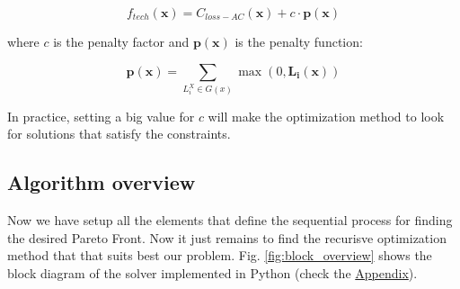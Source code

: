 \documentclass[a4paper,11pt, titlepage, twoside]{article}
\begin{document}
\begin{equation}
    f_{tech}(\mathbf{x}) = C_{loss-AC}(\mathbf{x}) + c \cdot \mathbf{p(x)}
\end{equation}

where $c$ is the penalty factor and $\mathbf{p(x)}$ is the penalty function:

\begin{equation}
    \mathbf{p(x)} = \sum_{L_i^X \in G(x)} \max(0, \mathbf{L_i(x)})
\end{equation}

In practice, setting a big value for $c$ will make the optimization method to look for solutions that satisfy the constraints.
\newpage
\subsection{Algorithm overview}

Now we have setup all the elements that define the sequential process for finding the desired Pareto Front. Now it just remains
to find the recurisve optimization method that that suits best our problem. Fig. \ref{fig:block_overview} shows the block diagram of the solver implemented in Python (check the \hyperref[Appendix]{Appendix}).
\end{document}
